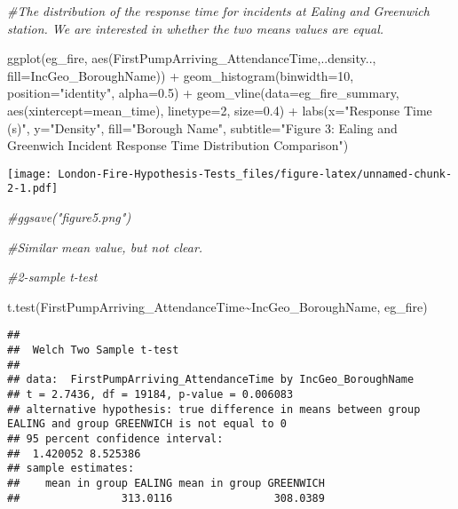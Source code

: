 \documentclass[
]{article}
\newenvironment{Shaded}{\begin{snugshade}}{\end{snugshade}}
\newcommand{\AttributeTok}[1]{\textcolor[rgb]{0.77,0.63,0.00}{#1}}
\newcommand{\CommentTok}[1]{\textcolor[rgb]{0.56,0.35,0.01}{\textit{#1}}}
\newcommand{\DecValTok}[1]{\textcolor[rgb]{0.00,0.00,0.81}{#1}}
\newcommand{\FloatTok}[1]{\textcolor[rgb]{0.00,0.00,0.81}{#1}}
\newcommand{\FunctionTok}[1]{\textcolor[rgb]{0.00,0.00,0.00}{#1}}
\newcommand{\NormalTok}[1]{#1}
\newcommand{\SpecialCharTok}[1]{\textcolor[rgb]{0.00,0.00,0.00}{#1}}
\newcommand{\StringTok}[1]{\textcolor[rgb]{0.31,0.60,0.02}{#1}}
\begin{document}
\begin{Shaded}
\begin{Highlighting}[]
\CommentTok{\#The distribution of the response time for incidents at Ealing and Greenwich station. We are interested in whether the two means values are equal.}

\FunctionTok{ggplot}\NormalTok{(eg\_fire, }\FunctionTok{aes}\NormalTok{(FirstPumpArriving\_AttendanceTime,..density.., }\AttributeTok{fill=}\NormalTok{IncGeo\_BoroughName)) }\SpecialCharTok{+} \FunctionTok{geom\_histogram}\NormalTok{(}\AttributeTok{binwidth=}\DecValTok{10}\NormalTok{, }\AttributeTok{position=}\StringTok{"identity"}\NormalTok{, }\AttributeTok{alpha=}\FloatTok{0.5}\NormalTok{) }\SpecialCharTok{+} \FunctionTok{geom\_vline}\NormalTok{(}\AttributeTok{data=}\NormalTok{eg\_fire\_summary, }\FunctionTok{aes}\NormalTok{(}\AttributeTok{xintercept=}\NormalTok{mean\_time), }\AttributeTok{linetype=}\DecValTok{2}\NormalTok{, }\AttributeTok{size=}\FloatTok{0.4}\NormalTok{) }\SpecialCharTok{+} \FunctionTok{labs}\NormalTok{(}\AttributeTok{x=}\StringTok{"Response Time (s)"}\NormalTok{, }\AttributeTok{y=}\StringTok{"Density"}\NormalTok{, }\AttributeTok{fill=}\StringTok{"Borough Name"}\NormalTok{, }\AttributeTok{subtitle=}\StringTok{"Figure 3: Ealing and Greenwich Incident Response Time Distribution Comparison"}\NormalTok{)}
\end{Highlighting}
\end{Shaded}

\texttt{[image: London-Fire-Hypothesis-Tests\_files/figure-latex/unnamed-chunk-2-1.pdf]}

\begin{Shaded}
\begin{Highlighting}[]
\CommentTok{\#ggsave("figure5.png")}

\CommentTok{\#Similar mean value, but not clear.}
\end{Highlighting}
\end{Shaded}

\begin{Shaded}
\begin{Highlighting}[]
\CommentTok{\#2{-}sample t{-}test}

\FunctionTok{t.test}\NormalTok{(FirstPumpArriving\_AttendanceTime}\SpecialCharTok{\textasciitilde{}}\NormalTok{IncGeo\_BoroughName, eg\_fire)}
\end{Highlighting}
\end{Shaded}

\begin{verbatim}
## 
##  Welch Two Sample t-test
## 
## data:  FirstPumpArriving_AttendanceTime by IncGeo_BoroughName
## t = 2.7436, df = 19184, p-value = 0.006083
## alternative hypothesis: true difference in means between group EALING and group GREENWICH is not equal to 0
## 95 percent confidence interval:
##  1.420052 8.525386
## sample estimates:
##    mean in group EALING mean in group GREENWICH 
##                313.0116                308.0389
\end{verbatim}
\end{document}
